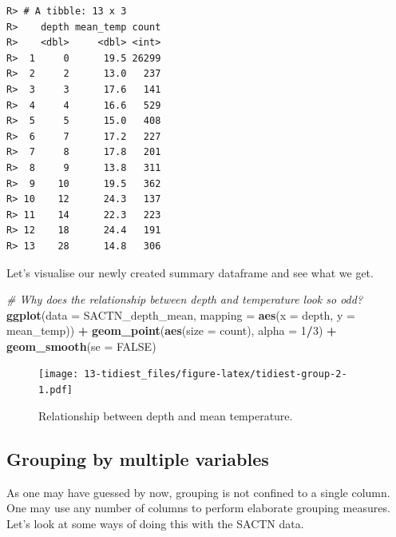 \documentclass[
]{book}
\newenvironment{Shaded}{\begin{snugshade}}{\end{snugshade}}
\newcommand{\CommentTok}[1]{\textcolor[rgb]{0.56,0.35,0.01}{\textit{#1}}}
\newcommand{\DataTypeTok}[1]{\textcolor[rgb]{0.13,0.29,0.53}{#1}}
\newcommand{\DecValTok}[1]{\textcolor[rgb]{0.00,0.00,0.81}{#1}}
\newcommand{\KeywordTok}[1]{\textcolor[rgb]{0.13,0.29,0.53}{\textbf{#1}}}
\newcommand{\NormalTok}[1]{#1}
\newcommand{\OperatorTok}[1]{\textcolor[rgb]{0.81,0.36,0.00}{\textbf{#1}}}
\newcommand{\OtherTok}[1]{\textcolor[rgb]{0.56,0.35,0.01}{#1}}
\newcommand{\StringTok}[1]{\textcolor[rgb]{0.31,0.60,0.02}{#1}}
\begin{document}
\begin{verbatim}
R> # A tibble: 13 x 3
R>    depth mean_temp count
R>    <dbl>     <dbl> <int>
R>  1     0      19.5 26299
R>  2     2      13.0   237
R>  3     3      17.6   141
R>  4     4      16.6   529
R>  5     5      15.0   408
R>  6     7      17.2   227
R>  7     8      17.8   201
R>  8     9      13.8   311
R>  9    10      19.5   362
R> 10    12      24.3   137
R> 11    14      22.3   223
R> 12    18      24.4   191
R> 13    28      14.8   306
\end{verbatim}

Let's visualise our newly created summary dataframe and see what we get.

\begin{Shaded}
\begin{Highlighting}[]
\CommentTok{\# Why does the relationship between depth and temperature look so odd?}
\KeywordTok{ggplot}\NormalTok{(}\DataTypeTok{data =}\NormalTok{ SACTN\_depth\_mean, }\DataTypeTok{mapping =} \KeywordTok{aes}\NormalTok{(}\DataTypeTok{x =}\NormalTok{ depth, }\DataTypeTok{y =}\NormalTok{ mean\_temp)) }\OperatorTok{+}
\StringTok{  }\KeywordTok{geom\_point}\NormalTok{(}\KeywordTok{aes}\NormalTok{(}\DataTypeTok{size =}\NormalTok{ count), }\DataTypeTok{alpha =} \DecValTok{1}\OperatorTok{/}\DecValTok{3}\NormalTok{) }\OperatorTok{+}
\StringTok{  }\KeywordTok{geom\_smooth}\NormalTok{(}\DataTypeTok{se =} \OtherTok{FALSE}\NormalTok{)}
\end{Highlighting}
\end{Shaded}

\begin{figure}
\centering
\texttt{[image: 13-tidiest\_files/figure-latex/tidiest-group-2-1.pdf]}
\caption{\label{fig:tidiest-group-2}Relationship between depth and mean temperature.}
\end{figure}

\hypertarget{grouping-by-multiple-variables}{%
\subsection{Grouping by multiple variables}\label{grouping-by-multiple-variables}}

As one may have guessed by now, grouping is not confined to a single column. One may use any number of columns to perform elaborate grouping measures. Let's look at some ways of doing this with the SACTN data.
\end{document}
